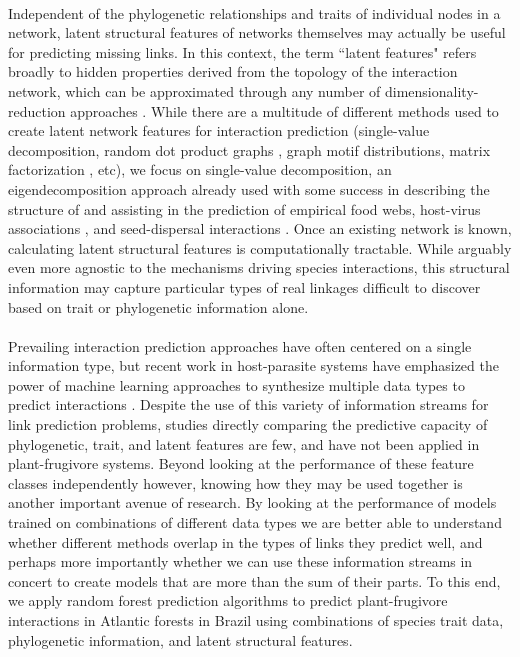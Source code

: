 \documentclass[num-refs]{article}%
\begin{document}
\paragraph*{}
Independent of the phylogenetic relationships and traits of individual nodes in a network, latent structural features of networks themselves may actually be useful for predicting missing links. In this context, the term ``latent features" refers broadly to hidden properties derived from the topology of the interaction network, which can be approximated through any number of dimensionality-reduction approaches \citep{poisot2021imputing}. While there are a multitude of different methods used to create latent network features for interaction prediction (single-value decomposition, random dot product graphs \citep{strydom2022food}, graph motif distributions, matrix factorization \citep{seo2018predicting}, etc), we focus on single-value decomposition, an eigendecomposition approach already used with some success in describing the structure of and assisting in the prediction of empirical food webs, \citep{banville2023constrains} host-virus associations \citep{poisot2021imputing, poisot2023network}, and seed-dispersal interactions \citep{nunes2024estimated}. Once an existing network is known, calculating latent structural features is computationally tractable. While arguably even more agnostic to the mechanisms driving species interactions, this structural information may capture particular types of real linkages difficult to discover based on trait or phylogenetic information alone. 


\paragraph*{}
Prevailing interaction prediction approaches have often centered on a single information type, but recent work in host-parasite systems have emphasized the power of machine learning approaches to synthesize multiple data types to predict interactions \citep{strydom2021roadmap}. Despite the use of this variety of information streams for link prediction problems, studies directly comparing the predictive capacity of phylogenetic, trait, and latent features are few, and have not been applied in plant-frugivore systems. Beyond looking at the performance of these feature classes independently however, knowing how they may be used together is another important avenue of research. By looking at the performance of models trained on combinations of different data types we are better able to understand whether different methods overlap in the types of links they predict well, and perhaps more importantly whether we can use these information streams in concert to create models that are more than the sum of their parts. To this end, we apply random forest prediction algorithms to predict plant-frugivore interactions in Atlantic forests in Brazil using combinations of species trait data, phylogenetic information, and latent structural features. 
\end{document}
